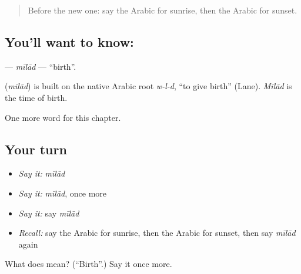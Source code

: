 \begin{quote}
Before the new one: say the Arabic for sunrise, then the Arabic for sunset.
\end{quote}

\subsection*{You'll want to know: }
\textbf{} — \emph{mīlād} — \textquotedblleft{}birth\textquotedblright{}.

\begin{cousinweb}
\textbf{} (\emph{mīlād}) is built on the native Arabic root \emph{w-l-d}, \textquotedblleft{}to give birth\textquotedblright{} (Lane). \emph{Mīlād} is the time of birth.
\end{cousinweb}

\begin{grammarlens}[title={What you've built}]
One more word for this chapter.
\end{grammarlens}

\subsection*{Your turn}
\begin{itemize}
\raggedright
  \item \emph{Say it:} \emph{mīlād}
  \item \emph{Say it:} \emph{mīlād}, once more
  \item \emph{Say it:} say \emph{mīlād}
  \item \emph{Recall:} say the Arabic for sunrise, then the Arabic for sunset, then say \emph{mīlād} again
\end{itemize}

\begin{tcolorbox}[breakable,colback=teal!4,colframe=teal!35!black,title={Before you move on}]
What does  mean? (\textquotedblleft{}Birth\textquotedblright{}.) Say it once more.
\end{tcolorbox}
